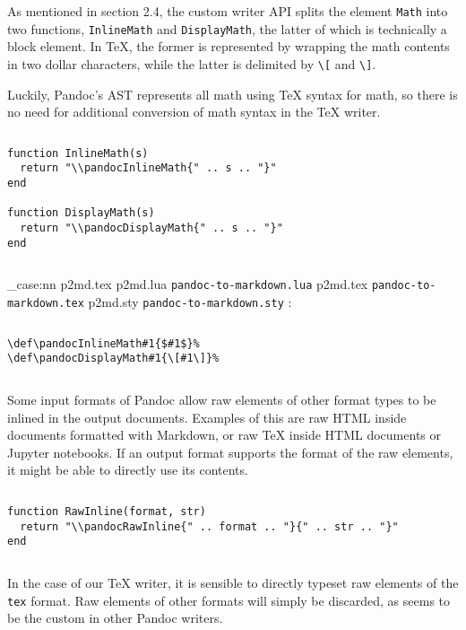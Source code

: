 \documentclass[
  digital,     %
  oneside,     %
  nosansbold,  %
  nocolorbold, %
  lof,         %
  nolot,       %
]{fithesis4}
\newcommand\file[1]
  {
    \str_case:nn
      { #1 }
      {
        { p2md.lua } { \texttt{pandoc\hyp{}to\hyp{}markdown.lua} }
        { p2md.tex } { \texttt{pandoc\hyp{}to\hyp{}markdown.tex} }
        { p2md.sty } { \texttt{pandoc\hyp{}to\hyp{}markdown.sty} }
      }
  }
\begin{document}
$ $

\noindent
As mentioned in section 2.4, the custom writer API splits the element \texttt{Math} into two functions, \texttt{InlineMath} and \texttt{DisplayMath}, the latter of which is technically a block element. In \TeX{}, the former is represented by wrapping the math contents in two dollar characters, while the latter is delimited by \texttt{\textbackslash{}[} and \texttt{\textbackslash{}]}.

Luckily, Pandoc's AST represents all math using \TeX{} syntax for math, so there is no need for additional conversion of math syntax in the \TeX{} writer.

$ $

\noindent
\lstset{language=[5.3]Lua}
\begin{lstlisting}
function InlineMath(s)
  return "\\pandocInlineMath{" .. s .. "}"
end

function DisplayMath(s)
  return "\\pandocDisplayMath{" .. s .. "}"
end
\end{lstlisting}

$ $

\noindent
\file{p2md.tex}:

$ $

\noindent
\lstset{language=[plain]TeX}
\begin{lstlisting}
\def\pandocInlineMath#1{$#1$}%
\def\pandocDisplayMath#1{\[#1\]}%
\end{lstlisting}

$ $

\noindent
Some input formats of Pandoc allow raw elements of other format types to be inlined in the output documents. Examples of this are raw HTML inside documents formatted with Markdown, or raw \TeX{} inside HTML documents or Jupyter notebooks. If an output format supports the format of the raw elements, it might be able to directly use its contents.

$ $

\noindent
\lstset{language=[5.3]Lua}
\begin{lstlisting}
function RawInline(format, str)
  return "\\pandocRawInline{" .. format .. "}{" .. str .. "}"
end
\end{lstlisting}

$ $

\noindent
In the case of our \TeX{} writer, it is sensible to directly typeset raw elements of the \texttt{tex} format. Raw elements of other formats will simply be discarded, as seems to be the custom in other Pandoc writers.
\end{document}
